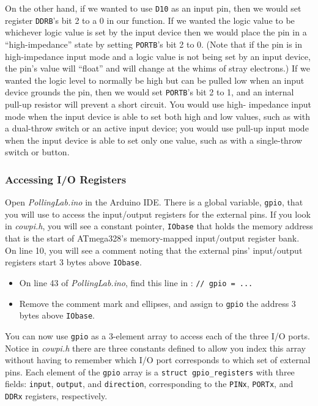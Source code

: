 On the other hand, if we wanted to use \texttt{D10} as an input pin, then we
would set register \texttt{DDRB}'s bit 2 to a 0 in our 
function. If we wanted the logic value to be whichever logic value is set by
the input device then we would place the pin in a ``high-impedance'' state by
setting \texttt{PORTB}'s bit 2 to 0. (Note that if the pin is in high-impedance
input mode and a logic value is not being set by an input device, the pin's
value will ``float'' and will change at the whims of stray electrons.) If we
wanted the logic level to normally be high but can be pulled low when an input
device grounds the pin, then we would set \texttt{PORTB}'s bit 2 to 1, and an
internal pull-up resistor will prevent a short circuit. You would use high-
impedance input mode when the input device is able to set both high and low
values, such as with a dual-throw switch or an active input device; you would
use pull-up input mode when the input device is able to set only one value,
such as with a single-throw switch or button.

\subsubsection{Accessing I/O Registers}

Open \textit{PollingLab.ino} in the Arduino IDE. There is a global variable,
\lstinline{gpio}, that you will use to access the input/output registers for
the external pins. If you look in \textit{cowpi.h}, you will see a constant
pointer, \lstinline{IObase} that holds the memory address that is the start of
ATmega328's memory-mapped input/output register bank. On line 10, you will see
a comment noting that the external pins' input/output registers start 3 bytes
above \lstinline{IObase}.

    \begin{itemize}
    \item On line 43 of \textit{PollingLab.ino}, find this line in : \lstinline{// gpio = ...}
    \item Remove the comment mark and ellipses, and assign to \lstinline{gpio} the address 3 bytes above \lstinline{IObase}.
    \end{itemize}

You can now use \lstinline{gpio} as a 3-element array to access each of the
three I/O ports. Notice in \textit{cowpi.h} there are three constants defined
to allow you index this array without having to remember which I/O port
corresponds to which set of external pins. Each element of the \lstinline{gpio}
array is a \lstinline{struct gpio_registers} with three fields:
\lstinline{input}, \lstinline{output}, and \lstinline{direction}, corresponding
to the \texttt{PINx}, \texttt{PORTx}, and \texttt{DDRx} registers, respectively.

